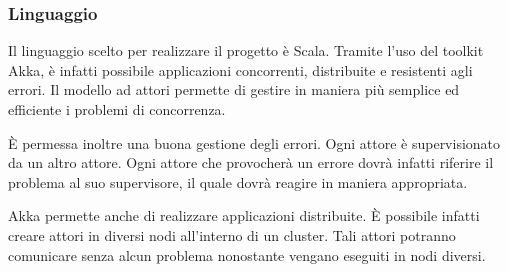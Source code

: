 \documentclass{article}
\begin{document}
\subsubsection{Linguaggio}
\lettrine[lines=1]{I}{}l linguaggio scelto per realizzare il progetto \`{e} Scala. Tramite l\textquoteright{}uso del toolkit Akka, \`{e} infatti possibile applicazioni concorrenti, distribuite e resistenti agli errori. Il modello ad attori permette di gestire in maniera pi\`{u} semplice ed efficiente i problemi di concorrenza.

\par \`{E} permessa inoltre una buona gestione degli errori. Ogni attore \`{e} supervisionato da un altro attore. Ogni attore che provocher\`{a} un errore dovr\`{a} infatti riferire il problema al suo supervisore, il quale dovr\`{a} reagire in maniera appropriata.
\par Akka permette anche di realizzare applicazioni distribuite. \`{E} possibile infatti creare attori in diversi nodi all\textquoteright{}interno di un cluster. Tali attori potranno comunicare senza alcun problema nonostante vengano eseguiti in nodi diversi.
\end{document}
